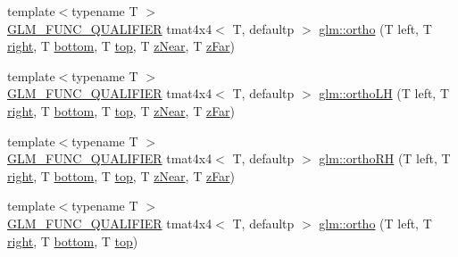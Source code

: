 \begin{DoxyCompactItemize}
\item 
{\footnotesize template$<$typename T $>$ }\\\mbox{\hyperlink{setup_8hpp_a33fdea6f91c5f834105f7415e2a64407}{G\+L\+M\+\_\+\+F\+U\+N\+C\+\_\+\+Q\+U\+A\+L\+I\+F\+I\+ER}} tmat4x4$<$ T, defaultp $>$ \mbox{\hyperlink{group__gtc__matrix__transform_ga65280251de6e38580110a0577a43d8f8}{glm\+::ortho}} (T left, T \mbox{\hyperlink{glad_8h_ab412e67df941b4600c352b0b9e76d2ee}{right}}, T \mbox{\hyperlink{glad_8h_a8f1e84df0c183c8fd701618316c9e280}{bottom}}, T \mbox{\hyperlink{glad_8h_ae78295170773f8782029afc65913897a}{top}}, T \mbox{\hyperlink{glad_8h_a48b62672ab8e9fe8f51a25e62e7bc888}{z\+Near}}, T \mbox{\hyperlink{glad_8h_a7f9438456c002a9d045c5e4c3b6a9cbb}{z\+Far}})
\item 
{\footnotesize template$<$typename T $>$ }\\\mbox{\hyperlink{setup_8hpp_a33fdea6f91c5f834105f7415e2a64407}{G\+L\+M\+\_\+\+F\+U\+N\+C\+\_\+\+Q\+U\+A\+L\+I\+F\+I\+ER}} tmat4x4$<$ T, defaultp $>$ \mbox{\hyperlink{group__gtc__matrix__transform_ga71503df1e691b12cc2d45e64fd0628fe}{glm\+::ortho\+LH}} (T left, T \mbox{\hyperlink{glad_8h_ab412e67df941b4600c352b0b9e76d2ee}{right}}, T \mbox{\hyperlink{glad_8h_a8f1e84df0c183c8fd701618316c9e280}{bottom}}, T \mbox{\hyperlink{glad_8h_ae78295170773f8782029afc65913897a}{top}}, T \mbox{\hyperlink{glad_8h_a48b62672ab8e9fe8f51a25e62e7bc888}{z\+Near}}, T \mbox{\hyperlink{glad_8h_a7f9438456c002a9d045c5e4c3b6a9cbb}{z\+Far}})
\item 
{\footnotesize template$<$typename T $>$ }\\\mbox{\hyperlink{setup_8hpp_a33fdea6f91c5f834105f7415e2a64407}{G\+L\+M\+\_\+\+F\+U\+N\+C\+\_\+\+Q\+U\+A\+L\+I\+F\+I\+ER}} tmat4x4$<$ T, defaultp $>$ \mbox{\hyperlink{group__gtc__matrix__transform_gada0aaaee76f1fd3c272698c8eca735a1}{glm\+::ortho\+RH}} (T left, T \mbox{\hyperlink{glad_8h_ab412e67df941b4600c352b0b9e76d2ee}{right}}, T \mbox{\hyperlink{glad_8h_a8f1e84df0c183c8fd701618316c9e280}{bottom}}, T \mbox{\hyperlink{glad_8h_ae78295170773f8782029afc65913897a}{top}}, T \mbox{\hyperlink{glad_8h_a48b62672ab8e9fe8f51a25e62e7bc888}{z\+Near}}, T \mbox{\hyperlink{glad_8h_a7f9438456c002a9d045c5e4c3b6a9cbb}{z\+Far}})
\item 
{\footnotesize template$<$typename T $>$ }\\\mbox{\hyperlink{setup_8hpp_a33fdea6f91c5f834105f7415e2a64407}{G\+L\+M\+\_\+\+F\+U\+N\+C\+\_\+\+Q\+U\+A\+L\+I\+F\+I\+ER}} tmat4x4$<$ T, defaultp $>$ \mbox{\hyperlink{group__gtc__matrix__transform_ga45b1b64f99255c07119b4f1aaed04dd7}{glm\+::ortho}} (T left, T \mbox{\hyperlink{glad_8h_ab412e67df941b4600c352b0b9e76d2ee}{right}}, T \mbox{\hyperlink{glad_8h_a8f1e84df0c183c8fd701618316c9e280}{bottom}}, T \mbox{\hyperlink{glad_8h_ae78295170773f8782029afc65913897a}{top}})

\end{DoxyCompactItemize}
